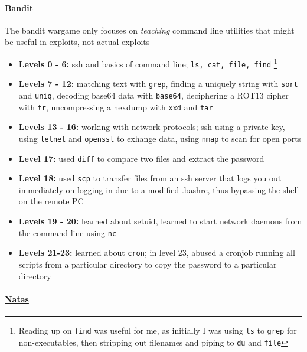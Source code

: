 \documentclass{article}
\def\code#1{\texttt{#1}}
\begin{document}
\paragraph{\href{http://overthewire.org/wargames/bandit/}{Bandit}}
The bandit wargame only focuses on \textit{teaching} command line utilities that might be useful in exploits, not actual exploits
\begin{itemize}
    
    \item \textbf{Levels 0 - 6: } ssh and basics of command line; \code{ls, cat, file, find} \footnote{Reading up on \code{find} was useful for me, as initially I was using \code{ls} to \code{grep} for non-executables, then stripping out filenames and piping to \code{du} and \code{file}}
    
    \item \textbf{Levels 7 - 12: } matching text with \code{grep}, finding a uniquely string with \code{sort} and \code{uniq}, decoding base64 data with \code{base64}, deciphering a ROT13 cipher with \code{tr}, uncompressing a hexdump with \code{xxd} and \code{tar}
    
    \item \textbf{Levels 13 - 16: } working with network protocols; ssh using a private key, using \code{telnet} and \code{openssl} to exhange data, using \code{nmap} to scan for open ports
    
    \item \textbf{Level 17: } used \code{diff} to compare two files and extract the password
    
    \item \textbf{Level 18: } used \code{scp} to transfer files from an ssh server that logs you out immediately on logging in due to a modified .bashrc, thus bypassing the shell on the remote PC
    
    \item \textbf{Levels 19 - 20: } learned about setuid, learned to start network daemons from the command line using \code{nc}
    
    \item \textbf{Levels 21-23: } learned about \code{cron}; in level 23, abused a cronjob running all scripts from a particular directory to copy the password to a particular directory

\end{itemize}

\paragraph{\href{http://overthewire.org/wargames/bandit}{Natas}}
\end{document}

